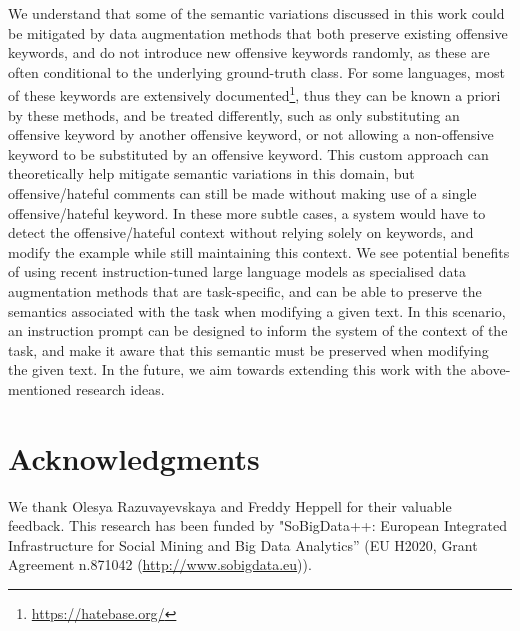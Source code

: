 \documentclass[11pt,a4paper]{article}
\begin{document}
We understand that some of the semantic variations discussed in this work could be mitigated by data augmentation methods that both preserve existing offensive keywords, and do not introduce new offensive keywords randomly, as these are often conditional to the underlying ground-truth class. For some languages, most of these keywords are extensively documented\footnote{\url{https://hatebase.org/}}, thus they can be known a priori by these methods, and be treated differently, such as only substituting an offensive keyword by another offensive keyword, or not allowing a non-offensive keyword to be substituted by an offensive keyword. This custom approach can theoretically help mitigate semantic variations in this domain, but offensive/hateful comments can still be made without making use of a single offensive/hateful keyword. In these more subtle cases, a system would have to detect the offensive/hateful context without relying solely on keywords, and modify the example while still maintaining this context. We see potential benefits of using recent instruction-tuned large language models \cite{ouyang2022training} as specialised data augmentation methods that are task-specific, and can be able to preserve the semantics associated with the task when modifying a given text. In this scenario, an instruction prompt can be designed to inform the system of the context of the task, and make it aware that this semantic must be preserved when modifying the given text. In the future, we aim towards extending this work with the above-mentioned research ideas.

\section*{Acknowledgments}
We thank Olesya Razuvayevskaya and Freddy Heppell for their valuable feedback. This research has been funded by "SoBigData++: European Integrated Infrastructure for Social Mining and Big Data Analytics” (EU H2020, Grant Agreement n.871042 (\url{http://www.sobigdata.eu})).





\end{document}
